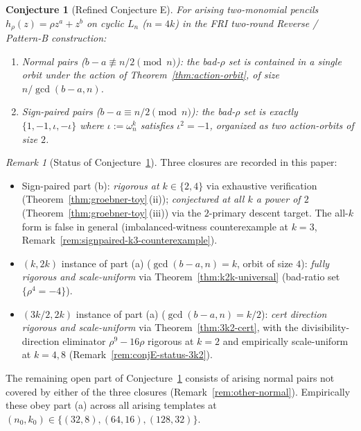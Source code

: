 \documentclass[11pt]{article}
\newtheorem{conjecture}[theorem]{Conjecture}
\theoremstyle{definition}
\theoremstyle{remark}
\newtheorem{remark}[theorem]{Remark}
\begin{document}
\begin{conjecture}[Refined Conjecture E]
\label{conj:E-refined}
For arising two-monomial pencils $h_\rho(z) = \rho z^a + z^b$ on cyclic $L_n$
($n = 4k$) in the FRI two-round Reverse / Pattern-B construction:
\begin{enumerate}[label=(\alph*)]
\item \emph{Normal pairs} ($b - a \not\equiv n/2 \pmod n$): the bad-$\rho$
set is contained in a single orbit under the action of
Theorem~\ref{thm:action-orbit}, of size $n / \gcd(b - a, n)$.
\item \emph{Sign-paired pairs} ($b - a \equiv n/2 \pmod n$): the bad-$\rho$
set is exactly $\{1, -1, \iota, -\iota\}$ where $\iota := \omega_n^{k}$
satisfies $\iota^2 = -1$, organized as two action-orbits of size $2$.
\end{enumerate}
\end{conjecture}

\begin{remark}[Status of Conjecture~\ref{conj:E-refined}]
\label{rem:conjE-status}
Three closures are recorded in this paper:
\begin{itemize}[nosep, leftmargin=1.2em]
\item Sign-paired part (b): \emph{rigorous at $k \in \{2, 4\}$} via
exhaustive verification (Theorem~\ref{thm:groebner-toy}\,(ii));
\emph{conjectured at all $k$ a power of $2$}
(Theorem~\ref{thm:groebner-toy}\,(iii)) via the $2$-primary descent
target. The all-$k$ form is false in general (imbalanced-witness
counterexample at $k = 3$, Remark~\ref{rem:signpaired-k3-counterexample}).
\item $(k, 2k)$ instance of part (a) ($\gcd(b{-}a, n) = k$, orbit of
size $4$): \emph{fully rigorous and scale-uniform} via
Theorem~\ref{thm:k2k-universal} (bad-ratio set $\{\rho^4 = -4\}$).
\item $(3k/2, 2k)$ instance of part (a) ($\gcd(b{-}a, n) = k/2$):
\emph{cert direction rigorous and scale-uniform} via
Theorem~\ref{thm:3k2-cert}, with the divisibility-direction
eliminator $\rho^9 - 16\rho$ rigorous at $k = 2$ and empirically
scale-uniform at $k = 4, 8$ (Remark~\ref{rem:conjE-status-3k2}).
\end{itemize}
The remaining open part of Conjecture~\ref{conj:E-refined} consists of
arising normal pairs not covered by either of the three closures
(Remark~\ref{rem:other-normal}). Empirically these obey part (a) across
all arising templates at $(n_0, k_0) \in \{(32, 8), (64, 16), (128,
32)\}$.
\end{remark}
\end{document}
